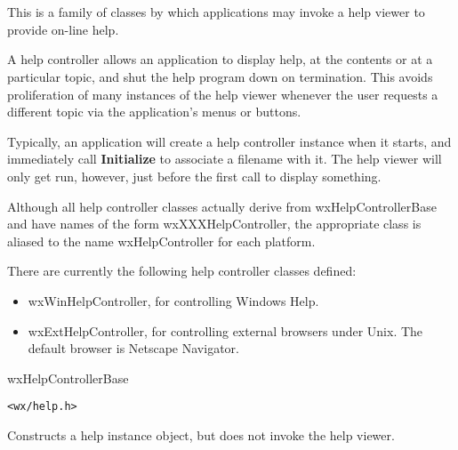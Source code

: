 \section{}\label{wxhelpcontroller}

This is a family of classes by which
applications may invoke a help viewer to provide on-line help.

A help controller allows an application to display help, at the contents
or at a particular topic, and shut the help program down on termination.
This avoids proliferation of many instances of the help viewer whenever the
user requests a different topic via the application's menus or buttons.

Typically, an application will create a help controller instance
when it starts, and immediately call {\bf Initialize}\rtfsp
to associate a filename with it. The help viewer will only get run, however,
just before the first call to display something.

Although all help controller classes actually derive from wxHelpControllerBase and have
names of the form wxXXXHelpController, the
appropriate class is aliased to the name wxHelpController for each platform.

There are currently the following help controller classes defined:

\begin{itemize}
\item wxWinHelpController, for controlling Windows Help.
\item wxExtHelpController, for controlling external browsers under Unix.
The default browser is Netscape Navigator.
\end{itemize}


wxHelpControllerBase\\


{\tt <wx/help.h>}




Constructs a help instance object, but does not invoke the help viewer.



